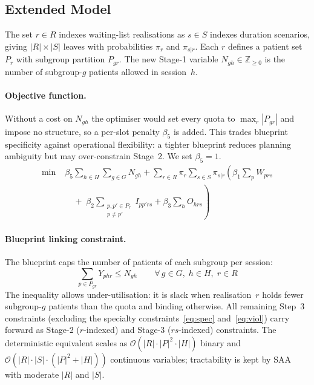 \subsection{Extended Model}
\label{sec:extended_model}
The set $r \in R$ indexes waiting-list realisations as $s \in S$ indexes duration
scenarios, giving $|R| \times |S|$ leaves with probabilities $\pi_r$ and
$\pi_{s|r}$. Each $r$ defines a patient set $P_r$ with subgroup partition
$P_{gr}$. The new Stage-1 variable $N_{gh} \in \mathbb{Z}_{\geq 0}$ is the number
of subgroup-$g$ patients allowed in session~$h$.

\paragraph{Objective function.}
Without a cost on $N_{gh}$ the optimiser would set every quota to
$\max_r |P_{gr}|$ and impose no structure, so a per-slot penalty $\beta_5$ is
added. This trades blueprint specificity against operational flexibility: a
tighter blueprint reduces planning ambiguity but may over-constrain Stage~2. We
set $\beta_5 = 1$. 
\begin{align}
  \min \; & \beta_5 \sum_{h \in H} \sum_{g \in G} N_{gh}
    + \sum_{r \in R} \pi_r \sum_{s \in S} \pi_{s|r} \left(
        \beta_1 \sum_{p} W_{prs} \right. \nonumber \\
  & \left. \quad
      + \; \beta_2 \sum_{\substack{p,p' \in P_r\\p \neq p'}} I_{pp'rs}
      + \beta_3 \sum_{h} O_{hrs}
    \right) \label{eq:three_stage_obj}
\end{align}

\paragraph{Blueprint linking constraint.}
The blueprint caps the number of patients of each subgroup per session:
\begin{equation}
  \sum_{p \in P_{gr}} Y_{phr} \leq N_{gh}
  \qquad \forall\, g \in G,\; h \in H,\; r \in R
  \label{eq:blueprint_link}
\end{equation}
The inequality allows under-utilisation: it is slack when realisation~$r$ holds
fewer subgroup-$g$ patients than the quota and binding otherwise. All remaining
Step~3 constraints (excluding the specialty
constraints~\eqref{eq:spec} and~\eqref{eq:viol}) carry forward as Stage-2
($r$-indexed) and Stage-3 ($rs$-indexed) constraints. The deterministic
equivalent scales as $\mathcal{O}(|R| \cdot |P|^2 \cdot |H|)$ binary and
$\mathcal{O}(|R| \cdot |S| \cdot (|P|^2 + |H|))$ continuous variables;
tractability is kept by SAA with moderate $|R|$ and $|S|$.

